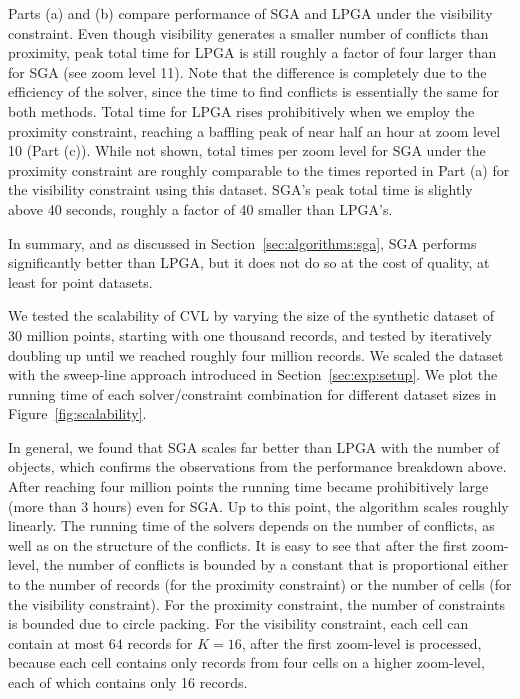 Parts (a) and (b) compare performance of SGA and LPGA under the visibility constraint. Even though visibility generates a smaller number of conflicts than proximity, peak total time for LPGA is still roughly a factor of four larger than for SGA (see zoom level 11). Note that the difference is completely due to the efficiency of the solver, since the time to find conflicts is essentially the same for both methods. Total time for LPGA rises prohibitively when we employ the proximity constraint, reaching a baffling peak of near half an hour at zoom level 10 (Part (c)). While not shown, total times per zoom level for SGA under the proximity constraint are roughly comparable to the times reported in Part (a) for the visibility constraint using this dataset. SGA's peak total time is slightly above 40 seconds, roughly a factor of 40 smaller than LPGA's.         

In summary, and as discussed in Section~\ref{sec:algorithms:sga}, SGA performs significantly better than LPGA, but it does not do so at the cost of quality, at least for point datasets.


We tested the scalability of CVL by varying the size of the synthetic dataset of 30 million points, starting with one thousand records, and tested by iteratively doubling up until we reached roughly four million records. We scaled the dataset with the sweep-line approach introduced in Section~\ref{sec:exp:setup}. We plot the running time of each solver/constraint combination for different dataset sizes in Figure~\ref{fig:scalability}.

In general, we found that SGA scales far better than LPGA with the number of objects, which confirms the observations from the performance breakdown above. After reaching four million points the running time became prohibitively large (more than 3 hours) even for SGA. Up to this point, the algorithm scales roughly linearly. The running time of the solvers depends on the number of conflicts, as well as on the structure of the conflicts. It is easy to see that after the first zoom-level, the number of conflicts is bounded by a constant that is proportional either to the number of records (for the proximity constraint) or the number of cells (for the visibility constraint). For the proximity constraint, the number of constraints is bounded due to circle packing. For the visibility constraint, each cell can contain at most $64$ records for $K=16$, after the first zoom-level is processed, because each cell contains only records from four cells on a higher zoom-level, each of which contains only 16 records.

